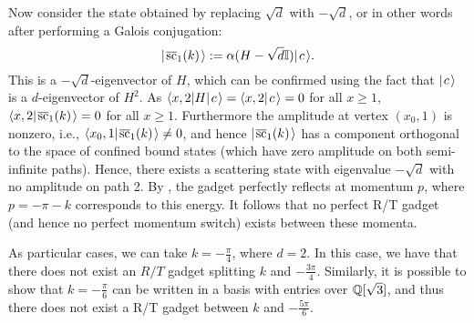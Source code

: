 \documentclass[../thesis-main/thesis-main]{subfiles}
\begin{document}
Now consider the state obtained by replacing $\sqrt{d}$ with $-\sqrt{d}$, or in other words after performing a Galois conjugation:
\begin{equation}
  |\mspace{2mu} \overline{\text{sc}}_1(k) \mspace{2mu} \rangle := \alpha (H-\sqrt{d}\mathbb{I}) |\mspace{2mu} c \mspace{2mu} \rangle.
\end{equation}
This is a $-\sqrt{d}$-eigenvector of $H$, which can be confirmed using the fact that $|\mspace{2mu} c \mspace{2mu} \rangle$ is a $d$-eigenvector of $H^2$. As $\langle{x,2} | H |\mspace{2mu} c \mspace{2mu} \rangle = \langle x,2 |\mspace{2mu} c \mspace{2mu} \rangle = 0$ for all $x\geq 1$, $\langle x,2 |\mspace{2mu} \overline{\text{sc}}_1(k) \mspace{2mu} \rangle = 0$ for all $x\geq 1$. Furthermore the amplitude at vertex $(x_0,1)$ is nonzero, i.e.,  $\langle x_0,1 |\mspace{2mu} \overline{\text{sc}}_1(k) \mspace{2mu} \rangle \neq 0$, and hence $|\mspace{2mu} \overline{\text{sc}}_1(k) \mspace{2mu} \rangle$ has a component orthogonal to the space of confined bound states (which have zero amplitude on both semi-infinite paths).  Hence, there exists a scattering state with eigenvalue $-\sqrt{d}$ with no amplitude on path 2. By , the gadget perfectly reflects at momentum $p$, where $p = -\pi - k$ corresponds to this energy.  It follows that no perfect R/T gadget (and hence no perfect momentum switch) exists between these momenta.

As particular cases, we can take $k = -\frac{\pi}{4}$, where $d = 2$.  In this case, we have that there does not exist an $R/T$ gadget splitting $k$ and $-\frac{3\pi}{4}$.   Similarly, it is possible to show that $k = -\frac{\pi}{6}$ can be written in a basis with entries over $\mathbb{Q}[\sqrt{3}]$, and thus there does not exist a R/T gadget between $k$ and $-\frac{5\pi}{6}$. 

%
%
%
%
%
\end{document}
